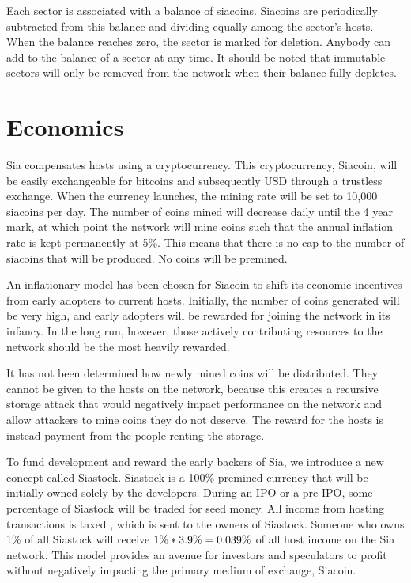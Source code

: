 \documentclass[twocolumn]{article}
\begin{document}
Each sector is associated with a balance of siacoins.
Siacoins are periodically subtracted from this balance and dividing equally among the sector's hosts.
When the balance reaches zero, the sector is marked for deletion.
Anybody can add to the balance of a sector at any time.
It should be noted that immutable sectors will only be removed from the network when their balance fully depletes.

\section{Economics}
Sia compensates hosts using a cryptocurrency.
This cryptocurrency, Siacoin, will be easily exchangeable for bitcoins and subsequently USD through a trustless exchange.
When the currency launches, the mining rate will be set to 10,000 siacoins per day.
The number of coins mined will decrease daily until the 4 year mark, at which point the network will mine coins such that the annual inflation rate is kept permanently at 5\%.
This means that there is no cap to the number of siacoins that will be produced.
No coins will be premined.

An inflationary model has been chosen for Siacoin to shift its economic incentives from early adopters to current hosts.
Initially, the number of coins generated will be very high, and early adopters will be rewarded for joining the network in its infancy.
In the long run, however, those actively contributing resources to the network should be the most heavily rewarded.

It has not been determined how newly mined coins will be distributed.
They cannot be given to the hosts on the network, because this creates a recursive storage attack that would negatively impact performance on the network and allow attackers to mine coins they do not deserve.
The reward for the hosts is instead payment from the people renting the storage.

To fund development and reward the early backers of Sia, we introduce a new concept called Siastock.
Siastock is a 100\% premined currency that will be initially owned solely by the developers.
During an IPO or a pre-IPO, some percentage of Siastock will be traded for seed money.
All income from hosting transactions is taxed \hostincomefee{}, which is sent to the owners of Siastock.
Someone who owns 1\% of all Siastock will receive \(1\% * 3.9\%{} = 0.039\%\) of all host income on the Sia network.
This model provides an avenue for investors and speculators to profit without negatively impacting the primary medium of exchange, Siacoin.
\end{document}
